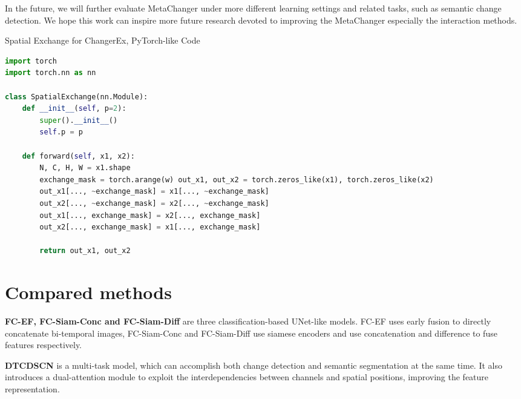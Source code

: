 \documentclass[10pt,twocolumn,letterpaper]{article}
\begin{document}
In the future, we will further evaluate MetaChanger under more different learning settings and related tasks, such as semantic change detection. We hope this work can inspire more future research devoted to improving the MetaChanger especially the interaction methods.


{\small


}



\setcounter{algorithm}{0}
\renewcommand{\thealgorithm}{B\arabic{algorithm}}










\begin{algorithm*}
\caption{Spatial Exchange for ChangerEx, PyTorch-like Code}\label{alg:cap2}
\begin{algorithmic}
\State
\begin{lstlisting}[language=Python]
import torch
import torch.nn as nn

class SpatialExchange(nn.Module):
    def __init__(self, p=2):
        super().__init__()
        self.p = p

    def forward(self, x1, x2):
        N, C, H, W = x1.shape
        exchange_mask = torch.arange(w) out_x1, out_x2 = torch.zeros_like(x1), torch.zeros_like(x2)
        out_x1[..., ~exchange_mask] = x1[..., ~exchange_mask]
        out_x2[..., ~exchange_mask] = x2[..., ~exchange_mask]
        out_x1[..., exchange_mask] = x2[..., exchange_mask]
        out_x2[..., exchange_mask] = x1[..., exchange_mask]

        return out_x1, out_x2
\end{lstlisting}
\end{algorithmic}
\end{algorithm*}

\newpage
\appendix


\section{Compared methods}
\label{section:Appendix A}

\textbf{FC-EF, FC-Siam-Conc and FC-Siam-Diff} \cite{daudt2018fully} are three classification-based UNet-like models. FC-EF uses early fusion to directly concatenate bi-temporal images, FC-Siam-Conc and FC-Siam-Diff use siamese encoders and use concatenation and difference to fuse features respectively.

\textbf{DTCDSCN} \cite{liu2020building} is a multi-task model, which can accomplish both change detection and semantic segmentation at the same time. It also introduces a dual-attention module to exploit the interdependencies between channels and spatial positions, improving the feature representation.
\end{document}
